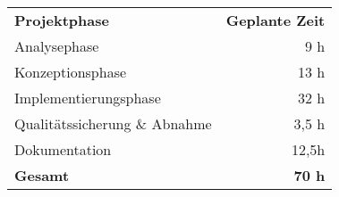 \begin{tabular}{lr}
    \hline
    \hline
    \rowcolor{heading}\textbf{Projektphase} & \textbf{Geplante Zeit} \\
    Analysephase & 9 h \\
    \rowcolor{odd}Konzeptionsphase & 13 h \\
    Implementierungsphase & 32 h \\
    \rowcolor{odd}Qualitätssicherung \& Abnahme & 3,5 h \\
    Dokumentation & 12,5h \\
    \hline
    \hline
    \rowcolor{odd}\textbf{Gesamt} & \textbf{70 h} \\
    \hline
\end{tabular}

